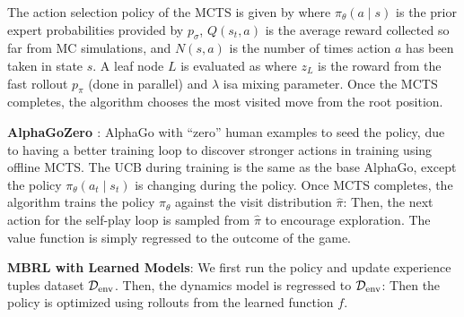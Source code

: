 \documentclass{article}
\begin{document}
  The action selection policy of the MCTS is given by
  where $\pi_\theta(a\mid s)$ is the prior expert probabilities provided by $p_\sigma$, $Q(s_t,a)$ is the average reward collected so far from MC simulations, and $N(s,a)$ is the number of times action $a$ has been taken in state $s$. A leaf node $L$ is evaluated as
  where $z_L$ is the roward from the fast rollout $p_\pi$ (done in parallel) and $\lambda$ isa mixing parameter. Once the MCTS completes, the algorithm chooses the most visited move from the root position. 

  \textbf{AlphaGoZero \cite{silver2017mastering}}: AlphaGo with ``zero'' human examples to seed the policy, due to having a better training loop to discover stronger actions in training using offline MCTS. The UCB during training is the same as the base AlphaGo, except the policy $\pi_\theta(a_t\mid s_t)$ is changing during the policy. Once MCTS completes, the algorithm  trains the policy $\pi_\theta$ against the visit distribution $\hat{\pi}$:
  Then, the next action for the self-play loop is sampled from $\hat{\pi}$ to encourage exploration. The value function is simply regressed to the outcome of the game. 

  \textbf{MBRL with Learned Models}: We first run the policy and update experience tuples dataset $\mathcal{D}_\text{env}$. Then, the dynamics model is regressed to $\mathcal{D}_\text{env}$:
  Then the policy is optimized using rollouts from the learned function $f$.
\end{document}
